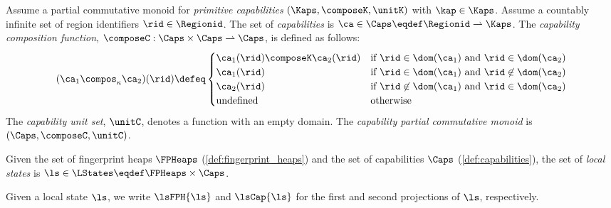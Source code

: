 
\begin{definition}[capabilities]\label{def:capabilities}
Assume a partial commutative monoid for \emph{primitive capabilities} $(\Kaps, \composeK, \unitK)$ with $\kap \in \Kaps$.
Assume a countably infinite set of region identifiers $\rid \in \Regionid$. The set of \emph{capabilities} is $\ca \in \Caps \eqdef \Regionid \rightharpoonup \Kaps$.
The \emph{capability composition function}, $\composeC: \Caps \times \Caps \rightharpoonup \Caps$, is defined as follows:
%
\[
	(\ca_1 \compos_{\kappa} \ca_2)(\rid) \defeq 
	\begin{cases}
		\ca_1(\rid) \composeK \ca_2(\rid) & \text{if } \rid \in \dom(\ca_1) \text{ and } \rid \in \dom(\ca_2) \\
		\ca_1(\rid) & \text{if } \rid \in \dom(\ca_1) \text{ and } \rid \not\in \dom(\ca_2) \\
		\ca_2(\rid) & \text{if } \rid \not\in \dom(\ca_1) \text{ and } \rid \in \dom(\ca_2) \\
		\text{undefined} & \text{otherwise}
	\end{cases}
\]
%
The \emph{capability unit set}, $\unitC$, denotes a function with an empty domain.
The \emph{capability partial commutative monoid} is $(\Caps, \composeC, \unitC)$. 
\end{definition}
%
%
\begin{definition}\label{def:local_state}
Given the set of fingerprint heaps $\FPHeaps$ (\ref{def:fingerprint_heaps}) and the set of capabilities $\Caps$ (\ref{def:capabilities}), the set of \emph{local states} is $\ls \in \LStates \eqdef \FPHeaps \times \Caps$.
\end{definition}
%
Given a local state $\ls$, we write $\lsFPH{\ls}$ and $\lsCap{\ls}$ for the first and second projections of $\ls$, respectively.
%
